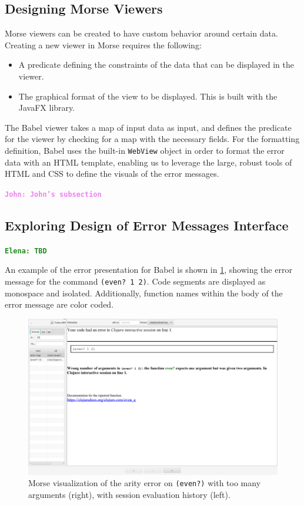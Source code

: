\documentclass[12pt]{article}
\newcommand{\comment}[1]{{\bf \tt  {#1}}}
\newcommand{\emcomment}[1]{\textcolor{ForestGreen}{\comment{Elena: {#1}}}}
\newcommand{\jwcomment}[1]{\textcolor{violet}{\comment{John: {#1}}}}
\begin{document}
\subsection{Designing Morse Viewers}\label{subsec:Morse-Viewers}
Morse viewers can be created to have custom behavior around certain data.
Creating a new viewer in Morse requires the following:
\begin{itemize}
	\item A predicate defining the constraints of the data that can be displayed in the viewer.
	\item The graphical format of the view to be displayed. This is built with the JavaFX library. 
\end{itemize}
The Babel viewer takes a map of input data as input, and defines the predicate for the viewer by checking for a map with the necessary fields.
For the formatting definition, Babel uses the built-in \texttt{WebView} object in order to format the error data with an HTML template,
enabling us to leverage the large, robust tools of HTML and CSS to define the visuals of the error messages.

\jwcomment{John's subsection}

\subsection{Exploring Design of Error Messages Interface}\label{subsec:interface}
\emcomment{TBD}

An example of the error presentation for Babel is shown in \ref{fig:babelview}, showing the error message for the command \texttt{(even? 1 2)}. 
Code segments are displayed as monospace and isolated. Additionally, function names within the body of the error message are color coded. 
\begin{figure}
	\centering
	\includegraphics[width=\linewidth]{resources/BabelViewerExample.png}
	\caption{Morse visualization of the arity error on \texttt{(even?)} with too many arguments (right), with session evaluation history (left).}
	\label{fig:babelview}
\end{figure}
\end{document}
